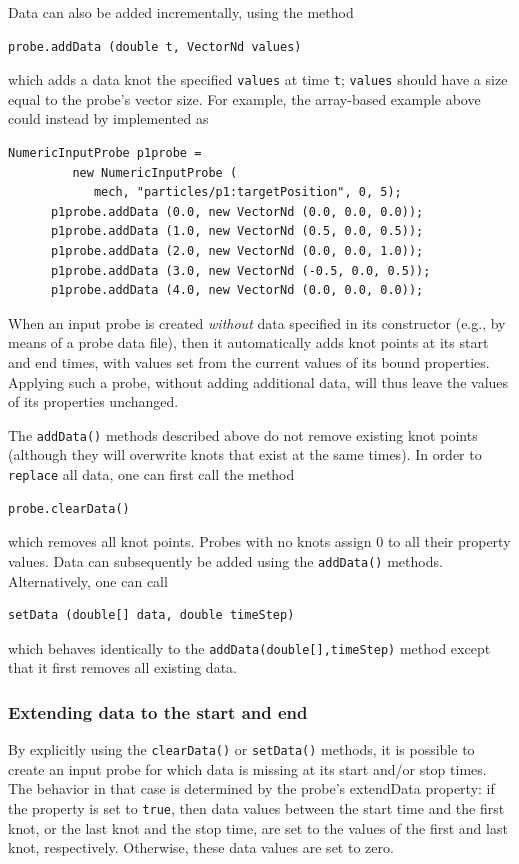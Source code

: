 Data can also be added incrementally, using the method
%
\begin{lstlisting}[]
   probe.addData (double t, VectorNd values)
\end{lstlisting}
%
which adds a data knot the specified {\tt values} at time {\tt t}; {\tt values}
should have a size equal to the probe's vector size. For example, the
array-based example above could instead by implemented as
\begin{lstlisting}[]
      NumericInputProbe p1probe =
         new NumericInputProbe (
            mech, "particles/p1:targetPosition", 0, 5);
      p1probe.addData (0.0, new VectorNd (0.0, 0.0, 0.0));
      p1probe.addData (1.0, new VectorNd (0.5, 0.0, 0.5));
      p1probe.addData (2.0, new VectorNd (0.0, 0.0, 1.0));
      p1probe.addData (3.0, new VectorNd (-0.5, 0.0, 0.5));
      p1probe.addData (4.0, new VectorNd (0.0, 0.0, 0.0));
\end{lstlisting}

When an input probe is created {\it without} data specified in its constructor
(e.g., by means of a probe data file), then it automatically adds knot points
at its start and end times, with values set from the current values of its
bound properties. Applying such a probe, without adding additional data, will
thus leave the values of its properties unchanged.

The {\tt addData()} methods described above do not remove existing knot points
(although they will overwrite knots that exist at the same times). In
order to {\tt replace} all data, one can first call the method
%
\begin{lstlisting}[]
   probe.clearData()
\end{lstlisting}
%
which removes all knot points. Probes with no knots assign 0 to all their
property values.  Data can subsequently be added using the {\tt addData()}
methods. Alternatively, one can call 
\begin{lstlisting}[]
   setData (double[] data, double timeStep)
\end{lstlisting}
%
which behaves identically to the {\tt addData(double[],timeStep)} method
except that it first removes all existing data.

\subsubsection{Extending data to the start and end}

By explicitly using the {\tt clearData()} or {\tt setData()} methods, it is
possible to create an input probe for which data is missing at its start and/or
stop times. The behavior in that case is determined by the probe's {\sf
extendData} property: if the property is set to {\tt true}, then data values
between the start time and the first knot, or the last knot and the stop time,
are set to the values of the first and last knot, respectively.  Otherwise,
these data values are set to zero.

